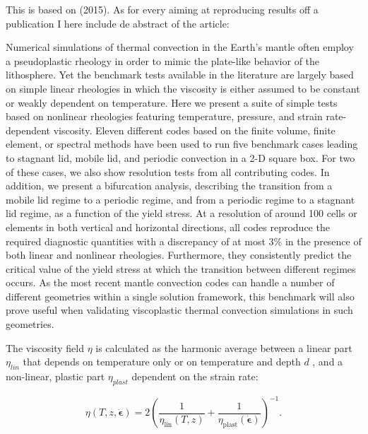 
This \stone is based on \textcite{tosn15} (2015).
As for every \stone aiming at reproducing results off a publication I here include de abstract
of the article:

\begin{displayquote}
{\color{darkgray}
Numerical simulations of thermal convection in the Earth’s mantle often employ a pseudoplastic 
rheology in order to mimic the plate-like behavior of the lithosphere. Yet the benchmark tests available
in the literature are largely based on simple linear rheologies in which the viscosity is either assumed to be
constant or weakly dependent on temperature. Here we present a suite of simple tests based on nonlinear
rheologies featuring temperature, pressure, and strain rate-dependent viscosity. Eleven different codes
based on the finite volume, finite element, or spectral methods have been used to run five benchmark cases
leading to stagnant lid, mobile lid, and periodic convection in a 2-D square box. For two of these cases, we
also show resolution tests from all contributing codes. In addition, we present a bifurcation analysis, describing 
the transition from a mobile lid regime to a periodic regime, and from a periodic regime to a stagnant
lid regime, as a function of the yield stress. At a resolution of around 100 cells or elements in both vertical
and horizontal directions, all codes reproduce the required diagnostic quantities with a discrepancy of at
most 3\% in the presence of both linear and nonlinear rheologies. Furthermore, they consistently predict
the critical value of the yield stress at which the transition between different regimes occurs. As the most
recent mantle convection codes can handle a number of different geometries within a single solution
framework, this benchmark will also prove useful when validating viscoplastic thermal convection 
simulations in such geometries.}
\end{displayquote}

The viscosity field $\eta$ is calculated as the harmonic average between a linear part $\eta_{lin}$ 
that depends on temperature only or on temperature and depth $d$ , and a non-linear,
plastic part $\eta_{plast}$ dependent on the strain rate:

\begin{equation}
\eta(T,z,\dot{\boldsymbol{\epsilon}}) = 
2 \left(\frac{1}{\eta_\text{lin}(T,z)} + \frac{1}{\eta_\text{plast}(\dot{\boldsymbol{\epsilon}})} \right)^{-1}. 
\label{eq:eta}
\end{equation}


